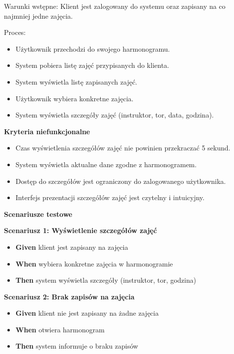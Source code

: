 \documentclass[a4paper,12pt]{article}
\begin{document}
\vspace{0,2cm}

\noindent Warunki wstępne: Klient jest zalogowany do systemu oraz zapisany na co najmniej jedne zajęcia.

\vspace{0,2cm}

\noindent Proces:

\begin{itemize}
    \item Użytkownik przechodzi do swojego harmonogramu.
    \item System pobiera listę zajęć przypisanych do klienta.
    \item System wyświetla listę zapisanych zajęć.
    \item Użytkownik wybiera konkretne zajęcia.
    \item System wyświetla szczegóły zajęć (instruktor, tor, data, godzina).
\end{itemize}

\noindent \textbf{Kryteria niefunkcjonalne}
\begin{itemize}
    \item Czas wyświetlenia szczegółów zajęć nie powinien przekraczać 5 sekund.
    \item System wyświetla aktualne dane zgodne z harmonogramem.
    \item Dostęp do szczegółów jest ograniczony do zalogowanego użytkownika.
    \item Interfejs prezentacji szczegółów zajęć jest czytelny i intuicyjny.
\end{itemize}

\noindent \textbf{Scenariusze testowe}

\textbf{Scenariusz 1: Wyświetlenie szczegółów zajęć}
\begin{itemize}
    \item \textbf{Given} klient jest zapisany na zajęcia
    \item \textbf{When} wybiera konkretne zajęcia w harmonogramie
    \item \textbf{Then} system wyświetla szczegóły (instruktor, tor, godzina)
\end{itemize}

\textbf{Scenariusz 2: Brak zapisów na zajęcia}
\begin{itemize}
    \item \textbf{Given} klient nie jest zapisany na żadne zajęcia
    \item \textbf{When} otwiera harmonogram
    \item \textbf{Then} system informuje o braku zapisów
\end{itemize}
\end{document}
